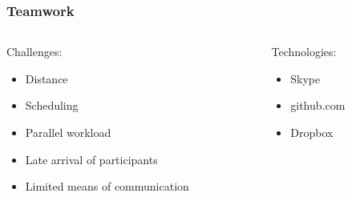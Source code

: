 \begin{frame}
	\frametitle{Teamwork}
	\begin{columns}[t]
		\begin{column}[t]{0.5\linewidth}
			Challenges:
			\begin{itemize}
				\item Distance
				\item Scheduling
				\item Parallel workload
				\item Late arrival of participants
				\item Limited means of communication
			\end{itemize}
		\end{column}
		\begin{column}[t]{0.5\linewidth}
			Technologies:
			\begin{itemize}
				\item Skype
				\item github.com
				\item Dropbox
			\end{itemize}
		\end{column}		
	\end{columns}
\end{frame}